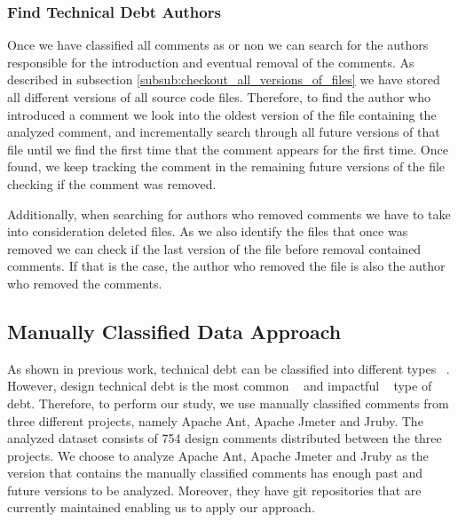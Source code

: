 \subsubsection*{Find Technical Debt Authors}
\label{subsub:find_technical_debt_authors}

Once we have classified all comments as \SATD or non \SATD we can search for the authors responsible for the introduction and eventual removal of the \SATD comments. As described in subsection \ref{subsub:checkout_all_versions_of_files} we have stored all different versions of all source code files. Therefore, to find the author who introduced a \SATD comment we look into the oldest version of the file containing the analyzed comment, and incrementally search through all future versions of that file until we find the first time that the comment appears for the first time. Once found, we keep tracking the \SATD comment in the remaining future versions of the file checking if  the \SATD comment was removed. 

Additionally, when searching for authors who removed \SATD comments we have to take into consideration deleted files. As we also identify the files that once was removed we can check if the last version of the file before removal contained \SATD comments. If that is the case, the author who removed the file is also the author who removed the \SATD comments. 

























\subsection*{Manually Classified Data Approach}
\label{sub:manually_classified_data_approach}

As shown in previous work, technical debt can be classified into different types ~\cite{Alves2014MTD}. However, design technical debt is the most common ~\cite{Maldonado2015MTD} and impactful ~\cite{Ernst2015FSE} type of debt. Therefore, to perform our study, we use manually classified \SATD comments from three different projects, namely Apache Ant, Apache Jmeter and Jruby. The analyzed dataset consists of 754 \SATD design comments distributed between the three projects. We choose to analyze Apache Ant, Apache Jmeter and Jruby as the version that contains the manually classified comments has enough past and future versions to be analyzed. Moreover, they have git repositories that are currently maintained enabling us to apply our approach. 

